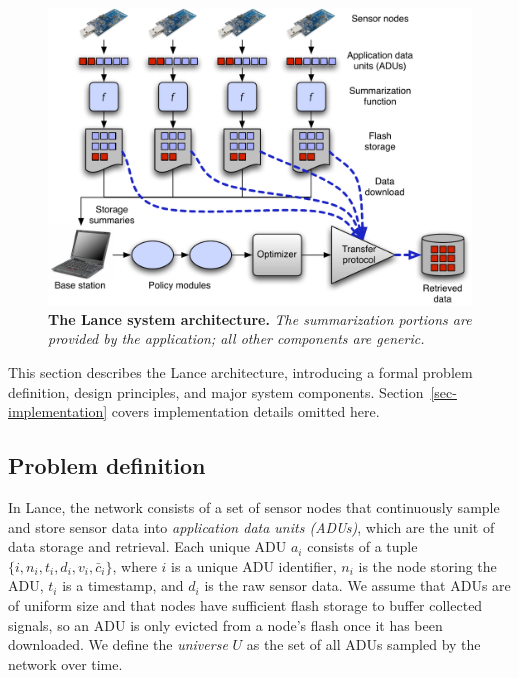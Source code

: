 \documentclass[lettersize]{sig-alternate-konrad}
\begin{document}
\begin{figure}[t]
\begin{center}
\includegraphics[width=1.0\hsize]{./figs/new-arch.pdf}
\end{center}
\caption{\small {\bf The Lance system architecture.} {\em The
summarization portions are provided by the
application; all other components are generic.}}
\label{fig-architecture}
\end{figure}

This section describes the Lance architecture, introducing a
formal problem definition, design principles, and major system components.
Section~\ref{sec-implementation} covers implementation details omitted here.

\subsection{Problem definition}
\label{sec-problem-definition}

In Lance, the network consists of a set of sensor nodes that continuously
sample and store sensor data into {\em application data units (ADUs)}, which
are the unit of data storage and retrieval.  Each unique ADU $a_i$ consists
of a tuple $\{ i, n_i, t_i, d_i, v_i, \bar{c}_i \}$, 
where $i$ is a unique ADU identifier,
$n_i$ is the node storing the ADU, $t_i$ is a timestamp, and $d_i$ is the raw
sensor data.  We assume that ADUs are of uniform size and that nodes 
have sufficient flash storage to buffer collected signals, so an 
ADU is only evicted from a node's flash once it has been downloaded.
We define the {\em universe} $U$ as the set of all ADUs sampled by the 
network over time. 
\end{document}
